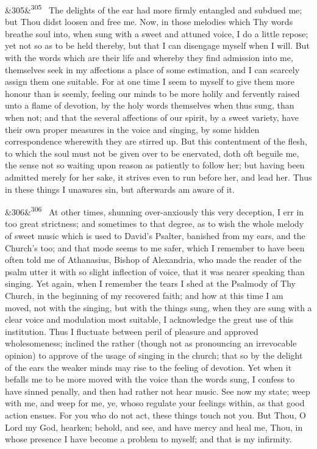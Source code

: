 \documentclass[12pt]{article}
\newcommand{\para}[1][]{\par\noindent\ifx&#1&\else\textsuperscript{\footnotesize #1}~\fi}
\begin{document}
\para[305] The delights of the ear had more firmly entangled and subdued me; but Thou didst loosen and free me. Now, in those melodies which Thy words breathe soul into, when sung with a sweet and attuned voice, I do a little repose; yet not so as to be held thereby, but that I can disengage myself when I will. But with the words which are their life and whereby they find admission into me, themselves seek in my affections a place of some estimation, and I can scarcely assign them one suitable. For at one time I seem to myself to give them more honour than is seemly, feeling our minds to be more holily and fervently raised unto a flame of devotion, by the holy words themselves when thus sung, than when not; and that the several affections of our spirit, by a sweet variety, have their own proper measures in the voice and singing, by some hidden correspondence wherewith they are stirred up. But this contentment of the flesh, to which the soul must not be given over to be enervated, doth oft beguile me, the sense not so waiting upon reason as patiently to follow her; but having been admitted merely for her sake, it strives even to run before her, and lead her. Thus in these things I unawares sin, but afterwards am aware of it.

\para[306] At other times, shunning over-anxiously this very deception, I err in too great strictness; and sometimes to that degree, as to wish the whole melody of sweet music which is used to David's Psalter, banished from my ears, and the Church's too; and that mode seems to me safer, which I remember to have been often told me of Athanasius, Bishop of Alexandria, who made the reader of the psalm utter it with so slight inflection of voice, that it was nearer speaking than singing. Yet again, when I remember the tears I shed at the Psalmody of Thy Church, in the beginning of my recovered faith; and how at this time I am moved, not with the singing, but with the things sung, when they are sung with a clear voice and modulation most suitable, I acknowledge the great use of this institution. Thus I fluctuate between peril of pleasure and approved wholesomeness; inclined the rather (though not as pronouncing an irrevocable opinion) to approve of the usage of singing in the church; that so by the delight of the ears the weaker minds may rise to the feeling of devotion. Yet when it befalls me to be more moved with the voice than the words sung, I confess to have sinned penally, and then had rather not hear music. See now my state; weep with me, and weep for me, ye, whoso regulate your feelings within, as that good action ensues. For you who do not act, these things touch not you. But Thou, O Lord my God, hearken; behold, and see, and have mercy and heal me, Thou, in whose presence I have become a problem to myself; and that is my infirmity.
\end{document}
